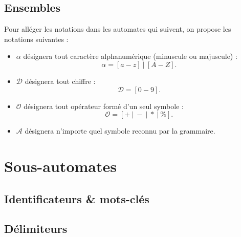 \documentclass[a4paper, 12pt]{report}
\begin{document}
\subsection{Ensembles}

Pour alléger les notations dans les automates qui suivent, on propose les notations suivantes :
\begin{itemize}[label=-]

\item $\alpha$ désignera tout caractère alphanumérique (minuscule ou majuscule) :
\[ \alpha = [a-z] \ | \ [A-Z]. \]

\item $\mathcal{D}$ désignera tout chiffre :
\[ \mathcal{D} = [0-9]	. \]

\item $\mathcal{O}$ désignera tout opérateur formé d'un seul symbole :
\[ \mathcal{O} = [+ \ | \ - \ | \ * \ | \ \% ]	. \]

\item $\mathcal{A}$ désignera n'importe quel symbole reconnu par la grammaire.

\end{itemize}

\newpage

\section{Sous-automates}

\subsection{Identificateurs \& mots-clés}

\begin{center}\end{center}

\subsection{Délimiteurs}
\end{document}
